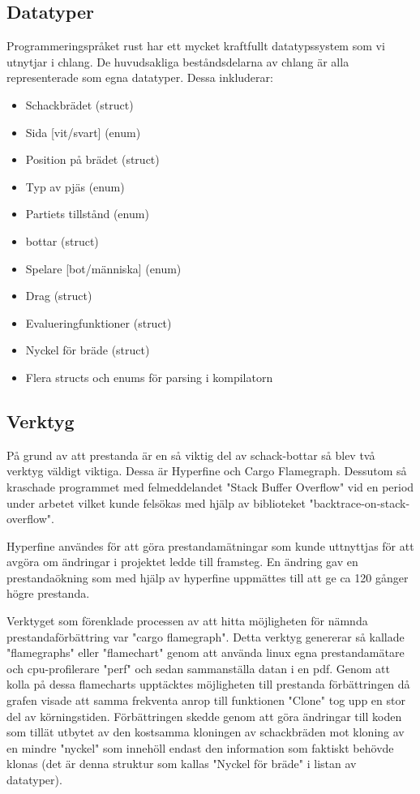 \documentclass{article}
\begin{document}
	\subsection{Datatyper}
	Programmeringspråket rust har ett mycket kraftfullt datatypssystem som vi utnytjar i chlang. De huvudsakliga beståndsdelarna av chlang är alla representerade som egna datatyper. Dessa inkluderar: 
	\begin{itemize}
	\item Schackbrädet (struct)
	\item Sida [vit/svart] (enum)
	\item Position på brädet (struct)
	\item Typ av pjäs (enum)
	\item Partiets tillstånd (enum)
	\item bottar (struct)
	\item Spelare [bot/människa] (enum)
	\item Drag (struct)
	\item Evalueringfunktioner (struct)
	\item Nyckel för bräde (struct)
	\item Flera structs och enums för parsing i kompilatorn
	\end{itemize}	

	\subsection{Verktyg}
	På grund av att prestanda är en så viktig del av schack-bottar så blev två verktyg väldigt viktiga. Dessa är Hyperfine och Cargo Flamegraph. Dessutom så kraschade programmet med felmeddelandet "Stack Buffer Overflow" vid en period under arbetet vilket kunde felsökas med hjälp av biblioteket "backtrace-on-stack-overflow".

	Hyperfine användes för att göra prestandamätningar som kunde uttnyttjas för att avgöra om ändringar i projektet ledde till framsteg. En ändring gav en prestandaökning som med hjälp av hyperfine uppmättes till att ge ca 120 gånger högre prestanda.

	Verktyget som förenklade processen av att hitta möjligheten för nämnda prestandaförbättring var "cargo flamegraph". Detta verktyg genererar så kallade "flamegraphs" eller "flamechart" genom att använda linux egna prestandamätare och cpu-profilerare "perf" och sedan sammanställa datan i  en pdf. Genom att kolla på dessa flamecharts upptäcktes möjligheten till prestanda förbättringen då grafen visade att samma frekventa anrop till funktionen "Clone" tog upp en stor del av körningstiden. Förbättringen skedde genom att göra ändringar till koden som tillät utbytet av den kostsamma kloningen av schackbräden mot kloning av en mindre "nyckel" som innehöll endast den information som faktiskt behövde klonas (det är denna struktur som kallas "Nyckel för bräde" i listan av datatyper).
\end{document}
